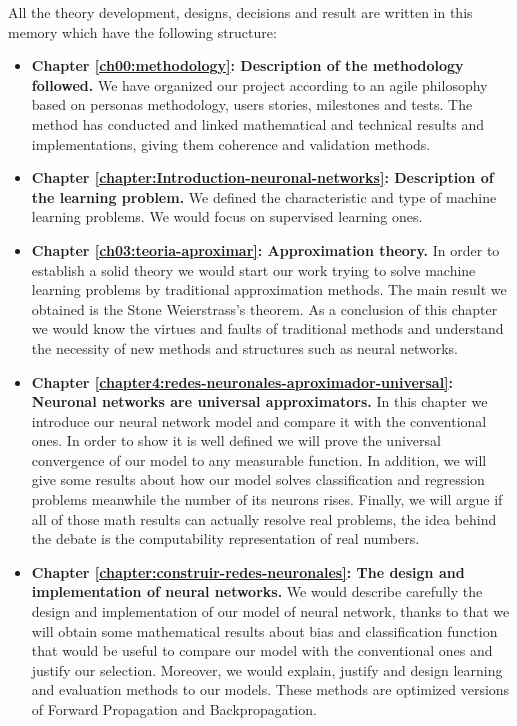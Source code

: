 All the theory development, designs, decisions and result are 
written in this memory which have the following structure: 
\begin{itemize}
 \item \textbf{Chapter \ref{ch00:methodology}: Description of the methodology followed.} We have organized our project according to an agile philosophy  based on personas methodology, users stories, milestones and tests. The method has conducted and linked mathematical and technical results and implementations, giving them coherence and validation methods. 

 \item \textbf{Chapter \ref{chapter:Introduction-neuronal-networks}: Description of the learning problem.} We defined the characteristic and type of machine learning problems. We would focus on supervised learning ones. 

 \item \textbf{Chapter \ref{ch03:teoria-aproximar}:  Approximation theory.} In order to establish a solid theory we would start our work trying to solve machine learning problems by traditional approximation methods.  The main result we obtained is the Stone Weierstrass’s theorem. As a conclusion of this chapter we would know the virtues and faults of traditional methods and understand the necessity of new methods and structures such as neural networks. 

 \item \textbf{Chapter \ref{chapter4:redes-neuronales-aproximador-universal}: Neuronal networks are universal approximators.}  In this chapter we introduce our neural network model and compare it with the conventional ones. In order to show it is well defined we will prove the universal convergence of our model to any measurable function. In addition, we will give some results about how our model solves classification and regression problems meanwhile the number of its neurons rises. Finally, we will argue if all of those math results can actually resolve real problems, the idea behind the debate is the computability representation of real numbers. 

 \item \textbf{Chapter  \ref{chapter:construir-redes-neuronales}: The design and implementation of neural networks.} We would describe carefully the design and implementation of our model of neural network, thanks to that we will obtain some mathematical results about bias and classification function that would be useful to compare our model with the conventional ones and justify 
our selection. Moreover, we would explain, justify and design  learning and evaluation methods to our models. These methods are optimized versions of Forward Propagation and Backpropagation. 


\end{itemize}
